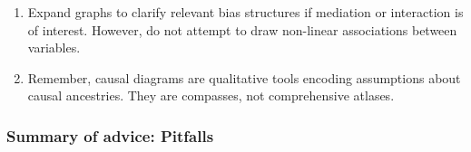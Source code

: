 \documentclass[
  singlecolumn]{article}
\begin{document}
\begin{enumerate}
\def\labelenumi{\arabic{enumi}.}
\setcounter{enumi}{10}
\item
  Expand graphs to clarify relevant bias structures if mediation or
  interaction is of interest. However, do not attempt to draw non-linear
  associations between variables.
\item
  Remember, causal diagrams are qualitative tools encoding assumptions
  about causal ancestries. They are compasses, not comprehensive
  atlases.
\end{enumerate}

\hypertarget{summary-of-advice-pitfalls}{%
\subsubsection{Summary of advice:
Pitfalls}\label{summary-of-advice-pitfalls}}
\end{document}
